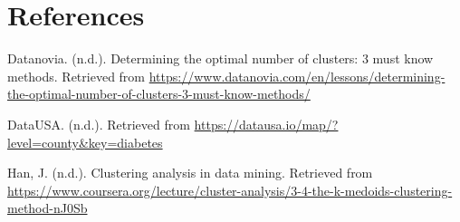 \documentclass[12pt,twoside]{amherstthesis}
\begin{document}
\begin{Shaded}
\begin{Highlighting}[]
  \StringTok{ }\OperatorTok{~}\StringTok{  }\OperatorTok{+}\StringTok{ }\OperatorTok{+}\StringTok{ }\OperatorTok{:}
  
  \StringTok{ }\OperatorTok{~}\StringTok{ }\OperatorTok{+}\StringTok{ }\OperatorTok{+}\StringTok{ }\OperatorTok{:}
  
  \StringTok{ }\OperatorTok{~}\StringTok{ }\OperatorTok{+}\StringTok{ }\OperatorTok{+}\StringTok{ }\OperatorTok{:}
  \end{Highlighting}
  \end{Shaded}
  
  \backmatter
  
  \chapter{References}\label{references}
  
  \noindent
  
  \setlength{\parindent}{-0.20in} \setlength{\leftskip}{0.20in}
  \setlength{\parskip}{8pt}
  
  \hypertarget{refs}{}
  \hypertarget{ref-Rec7}{}
  Datanovia. (n.d.). Determining the optimal number of clusters: 3 must
  know methods. Retrieved from
  \url{https://www.datanovia.com/en/lessons/determining-the-optimal-number-of-clusters-3-must-know-methods/}
  
  \hypertarget{ref-data}{}
  DataUSA. (n.d.). Retrieved from
  \url{https://datausa.io/map/?level=county\&key=diabetes}
  
  \hypertarget{ref-Rec13}{}
  Han, J. (n.d.). Clustering analysis in data mining. Retrieved from
  \url{https://www.coursera.org/lecture/cluster-analysis/3-4-the-k-medoids-clustering-method-nJ0Sb}
  
\end{document}
